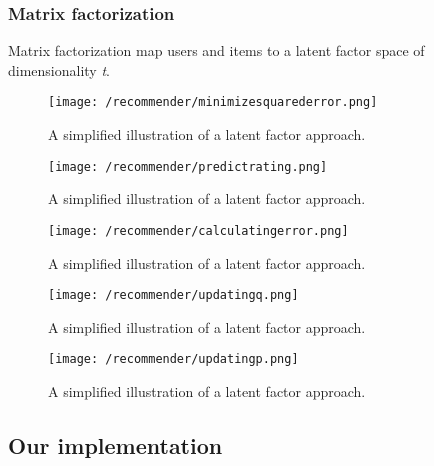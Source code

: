 \subsubsection{Matrix factorization}
Matrix factorization map users and items to a latent factor space of dimensionality \textit{t}. 
\begin{figure}[H]
    \centering
    \texttt{[image: /recommender/minimizesquarederror.png]}
     \caption{A simplified illustration of a latent factor approach.}
     \label{fig:minimizesquarederror}
 \end{figure}
 \noindent

 \begin{figure}[H]
    \centering
    \texttt{[image: /recommender/predictrating.png]}
     \caption{A simplified illustration of a latent factor approach.}
     \label{fig:predictrating}
 \end{figure}
 \noindent
 
 \begin{figure}[H]
    \centering
    \texttt{[image: /recommender/calculatingerror.png]}
     \caption{A simplified illustration of a latent factor approach.}
     \label{fig:calculatingerror}
 \end{figure}
 \noindent
 
 \begin{figure}[H]
    \centering
    \texttt{[image: /recommender/updatingq.png]}
     \caption{A simplified illustration of a latent factor approach.}
     \label{fig:updatingq}
 \end{figure}
 \noindent
 
 \begin{figure}[H]
    \centering
    \texttt{[image: /recommender/updatingp.png]}
     \caption{A simplified illustration of a latent factor approach.}
     \label{fig:updatingp}
 \end{figure}
 \noindent
\subsection{Our implementation}
